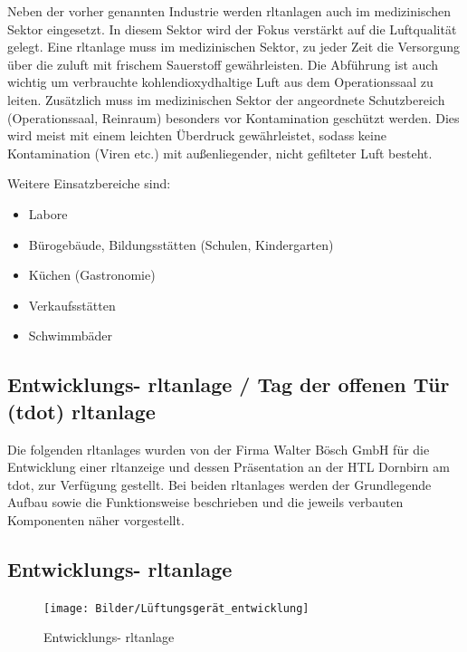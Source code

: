Neben der vorher genannten Industrie werden \ac{rltanlage}n auch im medizinischen Sektor eingesetzt. In diesem Sektor wird der Fokus verstärkt auf die Luftqualität gelegt. Eine \ac{rltanlage} muss im medizinischen Sektor, zu jeder Zeit die Versorgung über die \gls{zuluft} mit frischem Sauerstoff gewährleisten. Die Abführung ist auch wichtig um verbrauchte kohlendioxydhaltige Luft aus dem Operationssaal zu leiten. Zusätzlich muss im medizinischen Sektor der angeordnete Schutzbereich (\zB Operationssaal, Reinraum) besonders vor Kontamination geschützt werden. Dies wird meist mit einem leichten Überdruck gewährleistet, sodass keine Kontamination (Viren etc.) mit außenliegender, nicht gefilteter Luft besteht.
\cite[vgl.][]{robatherm:2019,robatherm:o.J.}

\newpage
Weitere Einsatzbereiche sind:
\begin{itemize}
	\item Labore
	\item Bürogebäude, Bildungsstätten (Schulen, Kindergarten)
	\item Küchen (Gastronomie)
	\item Verkaufsstätten
	\item Schwimmbäder
\end{itemize} 
\cite[vgl.][]{robatherm:2019,induux_wiki:2023}

\subsection{Entwicklungs- \ac{rltanlage} / Tag der offenen Tür (\gls{tdot}) \ac{rltanlage}}

Die folgenden \acp{rltanlage} wurden von der Firma Walter Bösch GmbH für die Entwicklung einer \ac{rltanzeige} und dessen Präsentation an der HTL Dornbirn am \gls{tdot}, zur Verfügung gestellt. Bei beiden \acp{rltanlage} werden der Grundlegende Aufbau sowie die Funktionsweise beschrieben und die jeweils verbauten Komponenten näher vorgestellt.

\subsection{Entwicklungs- \ac{rltanlage}} \label{entwicklungs_rlt}

\begin{figure}[H]
	\centering
	\texttt{[image: Bilder/Lüftungsgerät\_entwicklung]}
	\caption{Entwicklungs- \ac{rltanlage}} 
	\label{fig:LG_entwicklung}
\end{figure}

